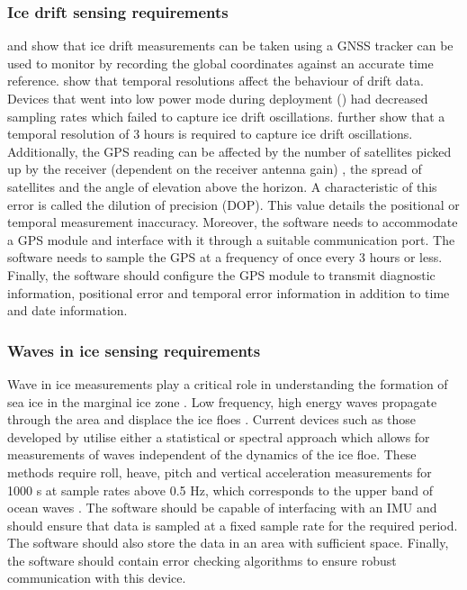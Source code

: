 \subsubsection{Ice drift sensing requirements}

\textcite{trident,uptempo,kohout2015device} and \textcite{albarello2020drift} show that ice drift measurements can be taken using a GNSS tracker can be used to monitor by recording the global coordinates against an accurate time reference. \textcite{alberello2019drift} show that temporal resolutions affect the behaviour of drift data. Devices that went into low power mode during deployment (\cite{vichi2019effects,alberello2019drift}) had decreased sampling rates which failed to capture ice drift oscillations. \textcite{albarello2020drift} further show that a temporal resolution of 3 hours is required to capture ice drift oscillations. Additionally, the GPS reading can be affected by the number of satellites picked up by the receiver (dependent on the receiver antenna gain) \cite{spilker1996global}, the spread of satellites and the angle of elevation above the horizon. A characteristic of this error is called the dilution of precision (DOP). This value details the positional or temporal measurement inaccuracy. Moreover, the software needs to accommodate a GPS module and interface with it through a suitable communication port. The software needs to sample the GPS at a frequency of once every 3 hours or less. Finally, the software should configure the GPS module to transmit diagnostic information, positional error and temporal error information in addition to time and date information.\par 

\subsubsection{Waves in ice sensing requirements}

Wave in ice measurements play a critical role in understanding the formation of sea ice in the marginal ice zone \cite{alberello2019drift}. Low frequency, high energy waves propagate through the area and displace the ice floes \cite{womack_2020}. Current devices such as those developed by \cite{rabault2017measurements,thomson2012wave,kohout2015device} utilise either a statistical \cite{kuik1988method} or spectral \cite{earle1996nondirectional,welch1967use} approach which allows for measurements of waves independent of the dynamics of the ice floe. These methods require roll, heave, pitch and vertical acceleration measurements for 1000 s at sample rates above 0.5 Hz, which corresponds to the upper band of ocean waves \cite{earle1996nondirectional}. The software should be capable of interfacing with an IMU and should ensure that data is sampled at a fixed sample rate for the required period. The software should also store the data in an area with sufficient space. Finally, the software should contain error checking algorithms to ensure robust communication with this device. \par 

